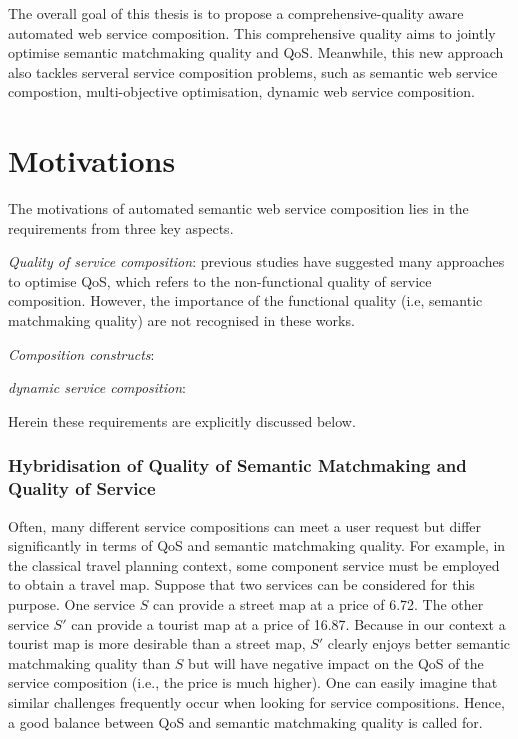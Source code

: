 The overall goal of this thesis is to propose a comprehensive-quality aware automated web service composition. This comprehensive quality aims to jointly optimise semantic matchmaking quality and QoS. Meanwhile, this new approach also tackles serveral service composition problems, such as semantic web service compostion, multi-objective optimisation, dynamic web service composition.

\section{Motivations}
The motivations of automated semantic web service composition lies in the requirements from three key aspects. 
\begin{enumerate*}
 \item \emph{Quality of service composition}: previous studies have suggested many approaches to optimise QoS, which refers to the non-functional quality of service composition. However, the importance of the functional quality (i.e, semantic matchmaking quality) are not recognised in these works.
 \item \emph{Composition constructs}:
 \item \emph{dynamic service composition}:
\end{enumerate*}
Herein these requirements are explicitly discussed below. 

\subsubsection{Hybridisation of Quality of Semantic Matchmaking and Quality of Service}
Often, many different service compositions can meet a user request but differ significantly in terms of QoS and semantic matchmaking quality. For example, in the classical travel planning context, some component service must be employed to obtain a travel map. Suppose that two services can be considered for this purpose. One service $S$ can provide a street map at a price of 6.72. The other service $S'$ can provide a tourist map at a price of 16.87. Because in our context a tourist map is more desirable than a street map, $S'$ clearly enjoys better semantic matchmaking quality than $S$ but will have negative impact on the QoS of the service composition (i.e., the price is much higher). One can easily imagine that similar challenges frequently occur when looking for service compositions. Hence, a good balance between QoS and semantic matchmaking quality is called for.

